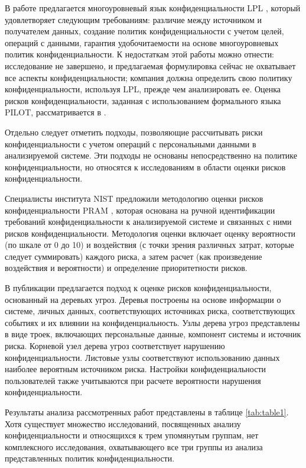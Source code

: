\documentclass[../main]{subfiles}
\begin{document}
В работе \cite{MDPI15} предлагается многоуровневый язык конфиденциальности LPL \cite{MDPI15}, который удовлетворяет следующим требованиям: различие между источником и получателем данных, создание политик конфиденциальности с учетом целей, операций с данными, гарантия удобочитаемости на основе многоуровневых политик конфиденциальности. К недостаткам этой работы можно отнести: исследование не завершено, и предлагаемая формулировка сейчас не охватывает все аспекты конфиденциальности; компания должна определить свою политику конфиденциальности, используя LPL, прежде чем анализировать ее. Оценка рисков конфиденциальности, заданная с использованием формального языка PILOT, рассматривается в \cite{MDPI14}.

Отдельно следует отметить подходы, позволяющие рассчитывать риски конфиденциальности с учетом операций с персональными данными в анализируемой системе. Эти подходы не основаны непосредственно на политике конфиденциальности, но относятся к исследованиям в области оценки рисков конфиденциальности.

Специалисты института NIST предложили методологию оценки рисков конфиденциальности PRAM \cite{MDPI16}, которая основана на ручной идентификации требований конфиденциальности к анализируемой системе и связанных с ними рисков конфиденциальности. Методология оценки включает оценку вероятности (по шкале от 0 до 10) и воздействия (с точки зрения различных затрат, которые следует суммировать) каждого риска, а затем расчет (как произведение воздействия и вероятности) и определение приоритетности рисков.

В публикации \cite{MDPI17} предлагается подход к оценке рисков конфиденциальности, основанный на деревьях угроз. Деревья построены на основе информации о системе, личных данных, соответствующих источниках риска, соответствующих событиях и их влиянии на конфиденциальность. Узлы дерева угроз представлены в виде троек, включающих персональные данные, компонент системы и источник риска. Корневой узел дерева угроз соответствует нарушению конфиденциальности. Листовые узлы соответствуют использованию данных наиболее вероятным источником риска. Настройки конфиденциальности пользователей также учитываются при расчете вероятности нарушения конфиденциальности.

Результаты анализа рассмотренных работ представлены в таблице \ref{tab:table1}. Хотя существует множество исследований, посвященных анализу конфиденциальности и относящихся к трем упомянутым группам, нет комплексного исследования, охватывающего все три группы из анализа представленных политик конфиденциальности.
\end{document}
